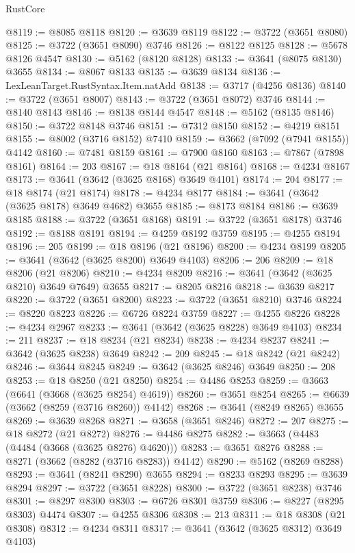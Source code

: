 \begin{lexlean}{RustCore}
\begin{coremodule}
@8119 := @8085 @8118
@8120 := @3639 @8119
@8122 := @3722 (@3651 @8080)
@8125 := @3722 (@3651 @8090) @3746
@8126 := @8122 @8125
@8128 := @5678 @8126 @4547
@8130 := @5162 (@8120 @8128)
@8133 := @3641 (@8075 @8130) @3655
@8134 := @8067 @8133
@8135 := @3639 @8134
@8136 := LexLeanTarget.RustSyntax.Item.natAdd
@8138 := @3717 (@4256 @8136)
@8140 := @3722 (@3651 @8007)
@8143 := @3722 (@3651 @8072) @3746
@8144 := @8140 @8143
@8146 := @8138 @8144 @4547
@8148 := @5162 (@8135 @8146)
@8150 := @3722 @8148 @3746
@8151 := @7312 @8150
@8152 := @4219 @8151
@8155 := @8002 (@3716 @8152) @7410
@8159 := @3662 (@7092 (@7941 @8155)) @4142
@8160 := @7481 @8159
@8161 := @7900 @8160
@8163 := @7867 (@7898 @8161)
@8164 := 203
@8167 := @18 @8164 (@21 @8164)
@8168 := @4234 @8167
@8173 := @3641 (@3642 (@3625 @8168) @3649 @4101)
@8174 := 204
@8177 := @18 @8174 (@21 @8174)
@8178 := @4234 @8177
@8184 := @3641 (@3642 (@3625 @8178) @3649 @4682) @3655
@8185 := @8173 @8184
@8186 := @3639 @8185
@8188 := @3722 (@3651 @8168)
@8191 := @3722 (@3651 @8178) @3746
@8192 := @8188 @8191
@8194 := @4259 @8192 @3759
@8195 := @4255 @8194
@8196 := 205
@8199 := @18 @8196 (@21 @8196)
@8200 := @4234 @8199
@8205 := @3641 (@3642 (@3625 @8200) @3649 @4103)
@8206 := 206
@8209 := @18 @8206 (@21 @8206)
@8210 := @4234 @8209
@8216 := @3641 (@3642 (@3625 @8210) @3649 @7649) @3655
@8217 := @8205 @8216
@8218 := @3639 @8217
@8220 := @3722 (@3651 @8200)
@8223 := @3722 (@3651 @8210) @3746
@8224 := @8220 @8223
@8226 := @6726 @8224 @3759
@8227 := @4255 @8226
@8228 := @4234 @2967
@8233 := @3641 (@3642 (@3625 @8228) @3649 @4103)
@8234 := 211
@8237 := @18 @8234 (@21 @8234)
@8238 := @4234 @8237
@8241 := @3642 (@3625 @8238) @3649
@8242 := 209
@8245 := @18 @8242 (@21 @8242)
@8246 := @3644 @8245
@8249 := @3642 (@3625 @8246) @3649
@8250 := 208
@8253 := @18 @8250 (@21 @8250)
@8254 := @4486 @8253
@8259 := @3663 (@6641 (@3668 (@3625 @8254) @4619))
@8260 := @3651 @8254
@8265 := @6639 (@3662 (@8259 (@3716 @8260)) @4142)
@8268 := @3641 (@8249 @8265) @3655
@8269 := @3639 @8268
@8271 := @3658 (@3651 @8246)
@8272 := 207
@8275 := @18 @8272 (@21 @8272)
@8276 := @4486 @8275
@8282 := @3663 (@4483 (@4484 (@3668 (@3625 @8276) @4620)))
@8283 := @3651 @8276
@8288 := @8271 (@3662 (@8282 (@3716 @8283)) @4142)
@8290 := @5162 (@8269 @8288)
@8293 := @3641 (@8241 @8290) @3655
@8294 := @8233 @8293
@8295 := @3639 @8294
@8297 := @3722 (@3651 @8228)
@8300 := @3722 (@3651 @8238) @3746
@8301 := @8297 @8300
@8303 := @6726 @8301 @3759
@8306 := @8227 (@8295 @8303) @4474
@8307 := @4255 @8306
@8308 := 213
@8311 := @18 @8308 (@21 @8308)
@8312 := @4234 @8311
@8317 := @3641 (@3642 (@3625 @8312) @3649 @4103)

\end{coremodule}
\end{lexlean}
